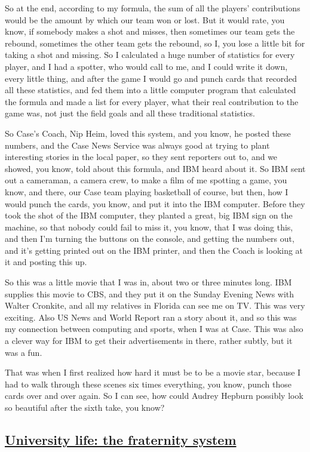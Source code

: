 \documentclass[]{article}
\begin{document}
So at the end, according to my formula, the sum of all the players'
contributions would be the amount by which our team won or lost. But it
would rate, you know, if somebody makes a shot and misses, then
sometimes our team gets the rebound, sometimes the other team gets the
rebound, so I, you lose a little bit for taking a shot and missing. So I
calculated a huge number of statistics for every player, and I had a
spotter, who would call to me, and I could write it down, every little
thing, and after the game I would go and punch cards that recorded all
these statistics, and fed them into a little computer program that
calculated the formula and made a list for every player, what their real
contribution to the game was, not just the field goals and all these
traditional statistics.

So Case's Coach, Nip Heim, loved this system, and you know, he posted
these numbers, and the Case News Service was always good at trying to
plant interesting stories in the local paper, so they sent reporters out
to, and we showed, you know, told about this formula, and IBM heard
about it. So IBM sent out a cameraman, a camera crew, to make a film of
me spotting a game, you know, and there, our Case team playing
basketball of course, but then, how I would punch the cards, you know,
and put it into the IBM computer. Before they took the shot of the IBM
computer, they planted a great, big IBM sign on the machine, so that
nobody could fail to miss it, you know, that I was doing this, and then
I'm turning the buttons on the console, and getting the numbers out, and
it's getting printed out on the IBM printer, and then the Coach is
looking at it and posting this up.

So this was a little movie that I was in, about two or three minutes
long. IBM supplies this movie to CBS, and they put it on the Sunday
Evening News with Walter Cronkite, and all my relatives in Florida can
see me on TV. This was very exciting. Also US News and World Report ran
a story about it, and so this was my connection between computing and
sports, when I was at Case. This was also a clever way for IBM to get
their advertisements in there, rather subtly, but it was a fun.

That was when I first realized how hard it must be to be a movie star,
because I had to walk through these scenes six times everything, you
know, punch those cards over and over again. So I can see, how could
Audrey Hepburn possibly look so beautiful after the sixth take, you
know?

\subsection{\texorpdfstring{\href{http://webofstories.com/play/17071}{University
life: the fraternity
system}}{University life: the fraternity system}}\label{university-life-the-fraternity-system}
\end{document}
